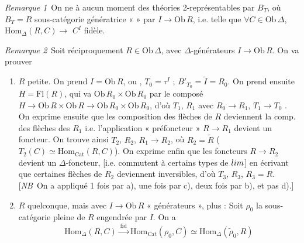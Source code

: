 \documentclass[11pt,a4paper]{article}
\begin{document}
\emph{Remarque 1}\ On ne  à aucun moment des
théories 2-représentables par $B_{T}$, où $B_{T} = R$   sous-catégorie génératrice
«  » par $I \to \mathrm{Ob}\,R$, i.e. telle que
$\forall C \in \mathrm{Ob}\,\Delta$, $\mathrm{Hom}_{\Delta}(R, C) \to$
 $C^{I}$ fidèle. 

\emph{Remarque 2}\ Soit réciproquement $R \in \mathrm{Ob}\,\Delta$,
avec $\Delta$-générateurs $I \to \mathrm{Ob}\,R$. On va prouver
 

\begin{enumerate}
  \item[1°)] $R$ petite. On prend $I = \mathrm{Ob}\,R$, ou
     \ill{}, $T_{0} = \tau^{I}$ ; $B'_{T_{0}} =
    \tilde{I} = R_{0}$. On prend ensuite $H = \mathrm{Fl}(R)$, qui va
     $\mathrm{Ob}\,R_{0} \times \mathrm{Ob}\,R_{0}$
     par le composé $H \to \mathrm{Ob}\,R
    \times \mathrm{Ob}\,R \to \mathrm{Ob}\,R_{0} \times \mathrm{Ob}\,R_{0}$,
    d'où $T_{1}$, $R_{1}$ avec $R_{0} \to R_{1}$, $T_{1} \to T_{0}$
     . On
    exprime ensuite que les composition des flèches de $R$ deviennent la
    comp. des flèches des $R_{1}$ i.e. l'application « préfoncteur »
    $R \to R_{1}$ devient un foncteur. On trouve ainsi $T_{2}$, $R_{2}$,
    $R_{1} \to R_{2}$, où $R_{2} = \tilde{R}$ ($T_{2}(C) \simeq
    \mathrm{Hom}_{\mathrm{Cat}}(R, C)$). On exprime enfin que les foncteurs
    $R \to R_{2}$ devient un $\Delta$-foncteur, [i.e. commutent à
    certains types de $\varprojlim$] en écrivant que certaines flèches de
    $R_{2}$ deviennent inversibles, d'où $T_{3}$, $R_{3}$, $R_{3} = R$.
    [\emph{NB}\ On a appliqué 1 fois par a), une fois par c), deux
    fois par b), et pas  d).]
  \item[2°)] $R$ quelconque, mais avec $I \to \mathrm{Ob}\,R$
    « générateurs », plus  : Soit $\rho_{0}$ la
    sous-catégorie pleine de $R$ engendrée par $I$. On a
    \[
      \mathrm{Hom}_{\Delta}(R, C) \xrightarrow{\ \text{fid}\ }
      \mathrm{Hom}_{\mathrm{Cat}}(\rho_{0}, C) \simeq
      \mathrm{Hom}_{\Delta}(\tilde{\rho}_{0}, R)
    \]
\end{enumerate}
\end{document}
